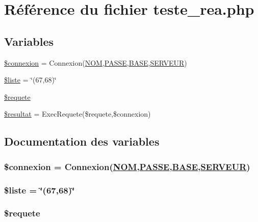 \hypertarget{teste__rea_8php}{
\section{R\'{e}f\'{e}rence du fichier teste\_\-rea.php}
\label{teste__rea_8php}
}
\subsection*{Variables}
\begin{CompactItemize}
\item 
\hyperlink{teste__rea_8php_a0}{\$connexion} = Connexion(\hyperlink{pma__connect_8php_a0}{NOM},\hyperlink{pma__connect_8php_a1}{PASSE},\hyperlink{pma__connect_8php_a3}{BASE},\hyperlink{pma__connect_8php_a2}{SERVEUR})
\item 
\hyperlink{teste__rea_8php_a1}{\$liste} = \char`\"{}(67,68)\char`\"{}
\item 
\hyperlink{teste__rea_8php_a2}{\$requete}
\item 
\hyperlink{teste__rea_8php_a3}{\$resultat} = Exec\-Requete(\$requete,\$connexion)
\end{CompactItemize}


\subsection{Documentation des variables}
\hypertarget{teste__rea_8php_a0}{
\subsubsection[\$connexion]{\setlength{\rightskip}{0pt plus 5cm}\$connexion = Connexion(\hyperlink{pma__connect_8php_a0}{NOM},\hyperlink{pma__connect_8php_a1}{PASSE},\hyperlink{pma__connect_8php_a3}{BASE},\hyperlink{pma__connect_8php_a2}{SERVEUR})}}
\label{teste__rea_8php_a0}


\hypertarget{teste__rea_8php_a1}{
\subsubsection[\$liste]{\setlength{\rightskip}{0pt plus 5cm}\$liste = \char`\"{}(67,68)\char`\"{}}}
\label{teste__rea_8php_a1}


\hypertarget{teste__rea_8php_a2}{
\subsubsection[\$requete]{\setlength{\rightskip}{0pt plus 5cm}\$requete}}
\label{teste__rea_8php_a2}



